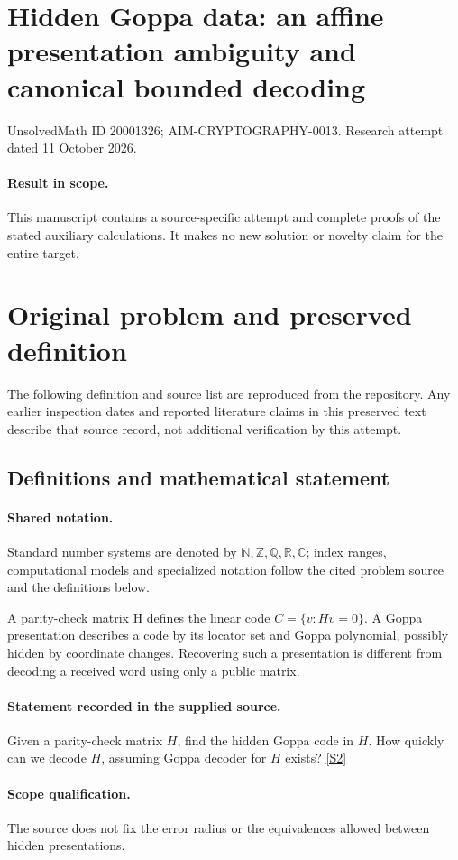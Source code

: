 \documentclass[11pt]{article}
\begin{document}
\section*{Hidden Goppa data: an affine presentation ambiguity and canonical bounded decoding}
\noindent UnsolvedMath ID 20001326; AIM-CRYPTOGRAPHY-0013. Research attempt dated 11 October 2026.
\paragraph{Result in scope.}This manuscript contains a source-specific attempt and complete proofs of the stated auxiliary calculations. It makes no new solution or novelty claim for the entire target.
\section{Original problem and preserved definition}
The following definition and source list are reproduced from the repository. Any earlier inspection dates and reported literature claims in this preserved text describe that source record, not additional verification by this attempt.
\subsection{Definitions and mathematical statement}

\paragraph{Shared notation.}Standard number systems are denoted by $\mathbb N,\mathbb Z,\mathbb Q,\mathbb R,\mathbb C$; index ranges, computational models and specialized notation follow the cited problem source and the definitions below.


A parity-check matrix H defines the linear code $C=\{v:Hv=0\}$. A Goppa presentation describes a code by its locator set and Goppa polynomial, possibly hidden by coordinate changes. Recovering such a presentation is different from decoding a received word using only a public matrix.
\paragraph{Statement recorded in the supplied source.}
Given a parity-check matrix $H$, find the hidden Goppa code in $H$. How quickly can we decode $H$, assuming Goppa decoder for $H$ exists? \href{http://aimpl.org/quantumalg/1/}{[S2]}
\paragraph{Scope qualification.}
The source does not fix the error radius or the equivalences allowed between hidden presentations.
\end{document}
